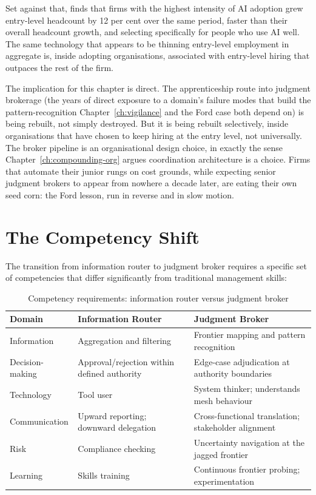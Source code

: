 Set against that, \textcite{RampRevelio2026} finds that firms with the highest intensity of AI adoption grew entry-level headcount by 12 per cent over the same period, faster than their overall headcount growth, and selecting specifically for people who use AI well. The same technology that appears to be thinning entry-level employment in aggregate is, inside adopting organisations, associated with entry-level hiring that outpaces the rest of the firm.

The implication for this chapter is direct. The apprenticeship route into judgment brokerage (the years of direct exposure to a domain's failure modes that build the pattern-recognition Chapter~\ref{ch:vigilance} and the Ford case both depend on) is being rebuilt, not simply destroyed. But it is being rebuilt selectively, inside organisations that have chosen to keep hiring at the entry level, not universally. The broker pipeline is an organisational design choice, in exactly the sense Chapter~\ref{ch:compounding-org} argues coordination architecture is a choice. Firms that automate their junior rungs on cost grounds, while expecting senior judgment brokers to appear from nowhere a decade later, are eating their own seed corn: the Ford lesson, run in reverse and in slow motion.

\section{The Competency Shift}

The transition from information router to judgment broker requires a specific set of competencies that differ significantly from traditional management skills:

\begin{table}[h]
\centering
\caption{Competency requirements: information router versus judgment broker}
\label{tab:competency-shift}
\begin{tabularx}{\textwidth}{l X X}
\toprule
\textbf{Domain} & \textbf{Information Router} & \textbf{Judgment Broker} \\
\midrule
Information & Aggregation and filtering & Frontier mapping and pattern recognition \\
\addlinespace
Decision-making & Approval/rejection within defined authority & Edge-case adjudication at authority boundaries \\
\addlinespace
Technology & Tool user & System thinker; understands mesh behaviour \\
\addlinespace
Communication & Upward reporting; downward delegation & Cross-functional translation; stakeholder alignment \\
\addlinespace
Risk & Compliance checking & Uncertainty navigation at the jagged frontier \\
\addlinespace
Learning & Skills training & Continuous frontier probing; experimentation \\
\bottomrule
\end{tabularx}
\end{table}

